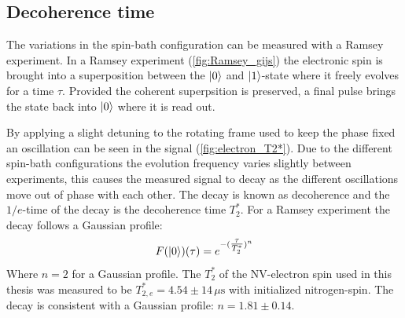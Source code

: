 \subsection{Decoherence time}
The variations in the spin-bath configuration can be measured with a Ramsey experiment.
In a Ramsey experiment (\cref{fig:Ramsey_gijs}) the electronic spin is brought into a superposition between the ${\left\vert{0}\right\rangle}$ and ${\left\vert{1}\right\rangle}$-state where it freely evolves for a time $\tau$.
Provided the coherent superpsition is preserved, a final pulse brings the state back into ${\left\vert{0}\right\rangle}$ where it is read out.

By applying a slight detuning to the rotating frame used to keep the phase fixed an oscillation can be seen in the signal (\cref{fig:electron_T2*}).
Due to the different spin-bath configurations the evolution frequency varies slightly between experiments, this causes the measured signal to decay as the different oscillations move out of phase with each other.
The decay is known as decoherence and the $1/e$-time of the decay is the decoherence time $T_2^*$.
For a Ramsey experiment the decay follows a Gaussian profile:
\begin{equation}
    F({\left\vert{0}\right\rangle})(\tau) = e^{-(\tfrac{\tau}{T_{2}^*})^n}
    \label{eq:Ramsey_decay}
\end{equation}
Where $n =2$ for a Gaussian profile.
The $T_2^*$ of the NV-electron spin used in this thesis was measured to be $T_{2,e}^* = 4.54 \pm 14\, \mu\mathrm{s}$ with initialized nitrogen-spin.
The decay is consistent with a Gaussian profile: $n = 1.81 \pm 0.14$.

